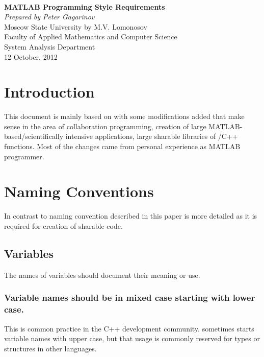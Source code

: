 \documentclass[titlepage,a4paper,12pt]{article}
\begin{document}
\begin{titlepage}
\begin{flushright}
\indent\vspace{4cm}\\
\Huge{\textbf{MATLAB Programming Style Requirements}}\\
\vspace{3cm} \Large{\textit{Prepared by Peter Gagarinov}}\\
\vspace{3cm} \large{Moscow State University by M.V. Lomonosov}\\
\vspace{1cm} \large{Faculty of Applied Mathematics and Computer Science}\\
\vspace{1cm} \large{System Analysis Department}\\
\vspace{3cm} \large{12 October, 2012}
\end{flushright}
\end{titlepage}

\section{Introduction}
This document is mainly based on \cite{MPS_G} with some
modifications added that make sense in the area of
collaboration programming, creation of large MATLAB-based/scientifically intensive applications,
large sharable libraries of
/C++ functions. Most of the changes came from personal
experience as MATLAB programmer.
\section{ Naming Conventions}
In contrast to \cite{MPS_G} naming convention described in this paper
is more detailed as it is required for creation of sharable code.
\subsection{Variables}
 The names of variables should document their
meaning or use.
\subsubsection{Variable names should be in mixed
case starting with lower case.}
 This is common practice in the C++
development community. \TMW sometimes starts variable names with
upper case, but that usage is commonly reserved for types or
structures in other languages.
\end{document}
